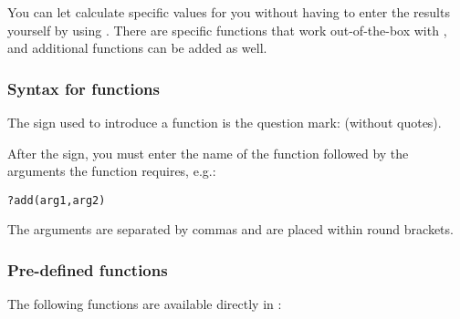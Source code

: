 
You can let \app{} calculate specific values for you without having to enter the results yourself by using . There are specific functions that work out-of-the-box with \app{}, and additional functions can be added as well. 

\subsubsection{Syntax for functions}
The sign used to introduce a function is the question mark:  (without quotes). 

After the sign, you must enter the name of the function followed by the arguments the function requires, e.g.:

\verb+?add(arg1,arg2)+

The arguments are separated by commas and are placed within round brackets. 

\subsubsection{Pre-defined functions}
The following functions are available directly in \app{}:

